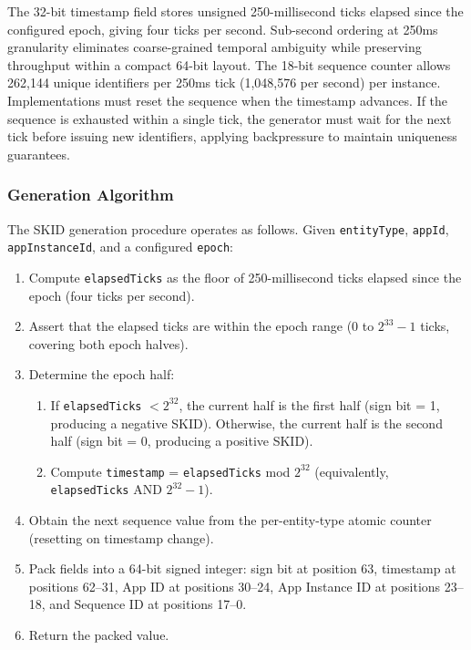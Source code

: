 \documentclass[fleqn,10pt]{wlpeerj}
\providecommand{\tightlist}{%
  \setlength{\itemsep}{0pt}\setlength{\parskip}{0pt}}
\begin{document}
The 32-bit timestamp field stores unsigned 250-millisecond ticks elapsed
since the configured epoch, giving four ticks per second. Sub-second
ordering at 250ms granularity eliminates coarse-grained temporal
ambiguity while preserving throughput within a compact 64-bit layout.
The 18-bit sequence counter allows 262,144 unique identifiers per 250ms
tick (1,048,576 per second) per instance. Implementations must reset the
sequence when the timestamp advances. If the sequence is exhausted
within a single tick, the generator must wait for the next tick before
issuing new identifiers, applying backpressure to maintain uniqueness
guarantees.

\subsubsection{Generation Algorithm}\label{generation-algorithm}

The SKID generation procedure operates as follows. Given
\texttt{entityType}, \texttt{appId}, \texttt{appInstanceId}, and a
configured \texttt{epoch}:

\begin{enumerate}
\def\labelenumi{\arabic{enumi}.}
\tightlist
\item
  Compute \texttt{elapsedTicks} as the floor of 250-millisecond ticks
  elapsed since the epoch (four ticks per second).
\item
  Assert that the elapsed ticks are within the epoch range (0 to
  \(2^{33} - 1\) ticks, covering both epoch halves).
\item
  Determine the epoch half:

  \begin{enumerate}
  \def\labelenumii{\arabic{enumii}.}
  \tightlist
  \item
    If \texttt{elapsedTicks} \(< 2^{32}\), the current half is the first
    half (sign bit = 1, producing a negative SKID). Otherwise, the
    current half is the second half (sign bit = 0, producing a positive
    SKID).
  \item
    Compute \texttt{timestamp} = \texttt{elapsedTicks} mod \(2^{32}\)
    (equivalently, \texttt{elapsedTicks} AND \(2^{32} - 1\)).
  \end{enumerate}
\item
  Obtain the next sequence value from the per-entity-type atomic counter
  (resetting on timestamp change).
\item
  Pack fields into a 64-bit signed integer: sign bit at position 63,
  timestamp at positions 62--31, App ID at positions 30--24, App
  Instance ID at positions 23--18, and Sequence ID at positions 17--0.
\item
  Return the packed value.
\end{enumerate}
\end{document}
